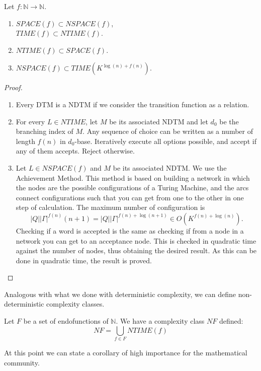 \begin{theorem}
  Let $f: \mathbb{N}\to  \mathbb{N}$.
  \begin{enumerate}
  \item $SPACE(f) \subset NSPACE(f)$,\\
    $TIME(f) \subset NTIME(f)$.
  \item $NTIME(f) \subset SPACE(f)$.
  \item $NSPACE(f) \subset TIME(K^{ \log(n)+ f(n)} )$.
  \end{enumerate}
\end{theorem}
\begin{proof}\hfill
  \begin{enumerate}
  \item Every DTM is a NDTM if we consider the transition function as a relation.
  
  \item For every $L\in NTIME$, let $M$ be its associated NDTM and let $d_0$ be the branching index of $M$. Any sequence of choice can be written as a number of length $f(n)$ in $d_0$-base. Iteratively execute all options possible, and accept if any of them accepts. Reject otherwise.
  \item Let $L \in NSPACE(f)$ and $M$ be its associated NDTM. We use the Achievement Method. This method is based on building a network in which the nodes are the possible configurations of a Turing Machine, and the arcs connect configurations such that you can get from one to the other in one step of calculation. The maximum number of configuration is $$|Q||\Gamma|^{f(n)} (n + 1) = |Q||\Gamma|^{f(n)+\log(n + 1)} \in O (K^{f(n)+\log(n)}).$$
Checking if a word is accepted is the same as checking if from a node in a network you can get to an acceptance node. This is checked in quadratic time against the number of nodes, thus obtaining the desired result. As this can be done in quadratic time, the result is proved.
  \end{enumerate}
\end{proof}

Analogous with what we done with deterministic complexity, we can define non-deterministic complexity classes.

\begin{definition}
  Let $F$ be a set of endofunctions of $\mathbb{N}$. We have a complexity class $NF$ defined:
  $$NF =  \bigcup_{f \in F} NTIME(f) $$
\end{definition}

At this point we can state a corollary of high importance for the mathematical community.

